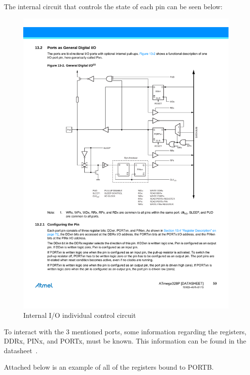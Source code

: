 \clearpage

The internal circuit that controls the state of each pin can be seen below:

\begin{figure}[H]
    \centering
    \includegraphics[scale = 0.9]{Graphics/MICROS/Practice 1/ARDUINO/INTERNAL_PIN_SETTING.pdf}
    \caption{Internal I/O individual control circuit~\autocite{ATMEGA328P}}
    \label{fig:I/O_CONTROL}
\end{figure}


To interact with the 3 mentioned ports, some information regarding the registers, DDRx, PINx, and PORTx, must be known. This information can be found in the datasheet~\autocite{ATMEGA328P}.\medskip

Attached below is an example of all of the registers bound to PORTB.

